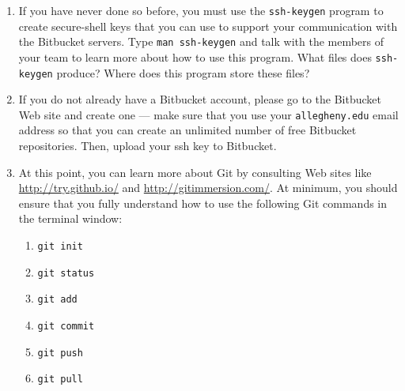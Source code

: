 \begin{enumerate}
	
  \item If you have never done so before, you must use the {\tt ssh-keygen} program to create secure-shell keys that you
    can use to support your communication with the Bitbucket servers.  Type {\tt man ssh-keygen} and talk with the
    members of your team to learn more about how to use this program.  What files does {\tt ssh-keygen} produce?  Where
    does this program store these files?

  \item If you do not already have a Bitbucket account, please go to the Bitbucket Web site and create one --- 
    make sure that you use your {\tt allegheny.edu} email address so that you can create an unlimited number of free
    Bitbucket repositories. Then, upload your ssh key to Bitbucket.

    \item At this point, you can learn more about Git by consulting Web sites like \url{http://try.github.io/} and
      \url{http://gitimmersion.com/}.  At minimum, you should ensure that you fully understand how to use the following
      Git commands in the terminal window:

      \begin{enumerate} 
        \item {\tt git init}
        \item {\tt git status}
        \item {\tt git add} 
        \item {\tt git commit}
        \item {\tt git push}
        \item {\tt git pull} 
      \end{enumerate}



\end{enumerate}
